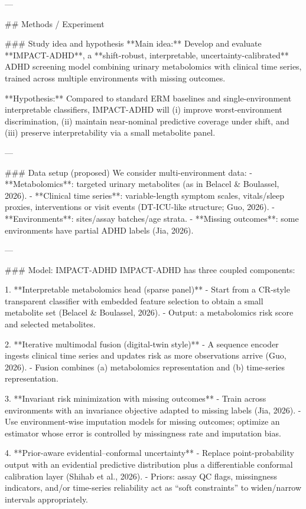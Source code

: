 ---

## Methods / Experiment  

### Study idea and hypothesis  
**Main idea:** Develop and evaluate **IMPACT-ADHD**, a **shift-robust, interpretable, uncertainty-calibrated** ADHD screening model combining urinary metabolomics with clinical time series, trained across multiple environments with missing outcomes.

**Hypothesis:** Compared to standard ERM baselines and single-environment interpretable classifiers, IMPACT-ADHD will (i) improve worst-environment discrimination, (ii) maintain near-nominal predictive coverage under shift, and (iii) preserve interpretability via a small metabolite panel.

---

### Data setup (proposed)  
We consider multi-environment data:  
- **Metabolomics**: targeted urinary metabolites (as in Belacel & Boulassel, 2026).  
- **Clinical time series**: variable-length symptom scales, vitals/sleep proxies, interventions or visit events (DT-ICU-like structure; Guo, 2026).  
- **Environments**: sites/assay batches/age strata.  
- **Missing outcomes**: some environments have partial ADHD labels (Jia, 2026).

---

### Model: IMPACT-ADHD  
IMPACT-ADHD has three coupled components:

1. **Interpretable metabolomics head (sparse panel)**  
   - Start from a CR-style transparent classifier with embedded feature selection to obtain a small metabolite set (Belacel & Boulassel, 2026).  
   - Output: a metabolomics risk score and selected metabolites.

2. **Iterative multimodal fusion (digital-twin style)**  
   - A sequence encoder ingests clinical time series and updates risk as more observations arrive (Guo, 2026).  
   - Fusion combines (a) metabolomics representation and (b) time-series representation.

3. **Invariant risk minimization with missing outcomes**  
   - Train across environments with an invariance objective adapted to missing labels (Jia, 2026).  
   - Use environment-wise imputation models for missing outcomes; optimize an estimator whose error is controlled by missingness rate and imputation bias.

4. **Prior-aware evidential–conformal uncertainty**  
   - Replace point-probability output with an evidential predictive distribution plus a differentiable conformal calibration layer (Shihab et al., 2026).  
   - Priors: assay QC flags, missingness indicators, and/or time-series reliability act as “soft constraints” to widen/narrow intervals appropriately.

